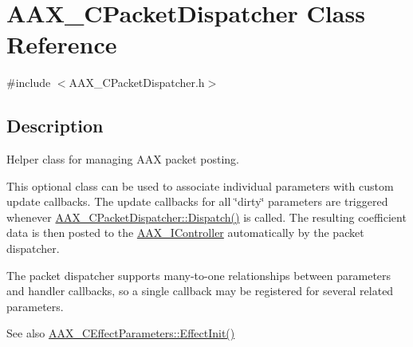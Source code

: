 \hypertarget{a01529}{}\section{A\+A\+X\+\_\+\+C\+Packet\+Dispatcher Class Reference}
\label{a01529}


{\ttfamily \#include $<$A\+A\+X\+\_\+\+C\+Packet\+Dispatcher.\+h$>$}



\subsection{Description}
Helper class for managing A\+AX packet posting. 

This optional class can be used to associate individual parameters with custom update callbacks. The update callbacks for all \char`\"{}dirty\char`\"{} parameters are triggered whenever \mbox{\hyperlink{a01529_aec68e7f8f440e394a3e4ab698a5f06f9}{A\+A\+X\+\_\+\+C\+Packet\+Dispatcher\+::\+Dispatch()}} is called. The resulting coefficient data is then posted to the \mbox{\hyperlink{a01789}{A\+A\+X\+\_\+\+I\+Controller}} automatically by the packet dispatcher.

The packet dispatcher supports many-\/to-\/one relationships between parameters and handler callbacks, so a single callback may be registered for several related parameters.

\begin{DoxySeeAlso}{See also}
\mbox{\hyperlink{a01481_a2e302fd758d39a6a855023bf825fe148}{A\+A\+X\+\_\+\+C\+Effect\+Parameters\+::\+Effect\+Init()}} 
\end{DoxySeeAlso}
